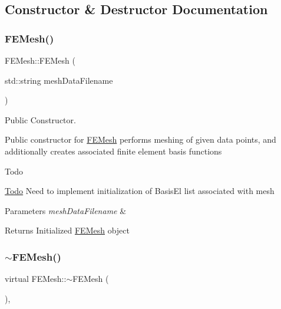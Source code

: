 \subsection{Constructor \& Destructor Documentation}
\mbox{\label{class_f_e_mesh_a3d79a6cd8810a53661cea79ed1fbe922}} 
\subsubsection{\texorpdfstring{F\+E\+Mesh()}{FEMesh()}}
{\footnotesize\ttfamily F\+E\+Mesh\+::\+F\+E\+Mesh (\begin{DoxyParamCaption}\item[{std\+::string}]{mesh\+Data\+Filename }\end{DoxyParamCaption})}



Public Constructor. 

Public constructor for \mbox{\hyperlink{class_f_e_mesh}{F\+E\+Mesh}} performs meshing of given data points, and additionally creates associated finite element basis functions \begin{DoxyRefDesc}{Todo}
\item[\mbox{\hyperlink{todo__todo000001}{Todo}}]Need to implement initialization of Basis\+El list associated with mesh \end{DoxyRefDesc}

\begin{DoxyParams}{Parameters}
{\em mesh\+Data\+Filename} & \\
\hline
\end{DoxyParams}
\begin{DoxyReturn}{Returns}
Initialized \mbox{\hyperlink{class_f_e_mesh}{F\+E\+Mesh}} object 
\end{DoxyReturn}
\mbox{\label{class_f_e_mesh_af4ea40d79e331fb1646da1f5766e22eb}} 
\subsubsection{\texorpdfstring{$\sim$\+F\+E\+Mesh()}{~FEMesh()}}
{\footnotesize\ttfamily virtual F\+E\+Mesh\+::$\sim$\+F\+E\+Mesh (\begin{DoxyParamCaption}{ }\end{DoxyParamCaption})\hspace{0.3cm}{\ttfamily [inline]}, {\ttfamily [virtual]}}




